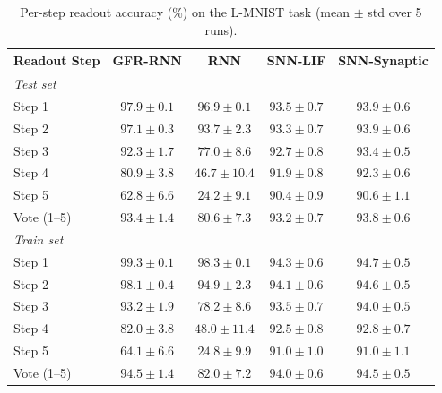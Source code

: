 \begin{table}[t]
    \caption{Per-step readout accuracy (\%) on the L-MNIST task (mean $\pm$ std over 5 runs).}
    \label{tab:per-step-accuracy}
    \centering
    \small
    \begin{tabular}{lcccc}
    \toprule
    \textbf{Readout Step} & \textbf{GFR-RNN} & \textbf{RNN} & \textbf{SNN-LIF} & \textbf{SNN-Synaptic} \\
    \midrule
    \multicolumn{5}{l}{\textit{Test set}} \\
    \midrule
    Step 1 & $97.9 \pm 0.1$ & $96.9 \pm 0.1$ & $93.5 \pm 0.7$ & $93.9 \pm 0.6$ \\
    Step 2 & $97.1 \pm 0.3$ & $93.7 \pm 2.3$ & $93.3 \pm 0.7$ & $93.9 \pm 0.6$ \\
    Step 3 & $92.3 \pm 1.7$ & $77.0 \pm 8.6$ & $92.7 \pm 0.8$ & $93.4 \pm 0.5$ \\
    Step 4 & $80.9 \pm 3.8$ & $46.7 \pm 10.4$ & $91.9 \pm 0.8$ & $92.3 \pm 0.6$ \\
    Step 5 & $62.8 \pm 6.6$ & $24.2 \pm 9.1$ & $90.4 \pm 0.9$ & $90.6 \pm 1.1$ \\
    Vote (1--5) & $93.4 \pm 1.4$ & $80.6 \pm 7.3$ & $93.2 \pm 0.7$ & $93.8 \pm 0.6$ \\
    \midrule
    \multicolumn{5}{l}{\textit{Train set}} \\
    \midrule
    Step 1 & $99.3 \pm 0.1$ & $98.3 \pm 0.1$ & $94.3 \pm 0.6$ & $94.7 \pm 0.5$ \\
    Step 2 & $98.1 \pm 0.4$ & $94.9 \pm 2.3$ & $94.1 \pm 0.6$ & $94.6 \pm 0.5$ \\
    Step 3 & $93.2 \pm 1.9$ & $78.2 \pm 8.6$ & $93.5 \pm 0.7$ & $94.0 \pm 0.5$ \\
    Step 4 & $82.0 \pm 3.8$ & $48.0 \pm 11.4$ & $92.5 \pm 0.8$ & $92.8 \pm 0.7$ \\
    Step 5 & $64.1 \pm 6.6$ & $24.8 \pm 9.9$ & $91.0 \pm 1.0$ & $91.0 \pm 1.1$ \\
    Vote (1--5) & $94.5 \pm 1.4$ & $82.0 \pm 7.2$ & $94.0 \pm 0.6$ & $94.5 \pm 0.5$ \\
    \bottomrule
    \end{tabular}
\end{table}
